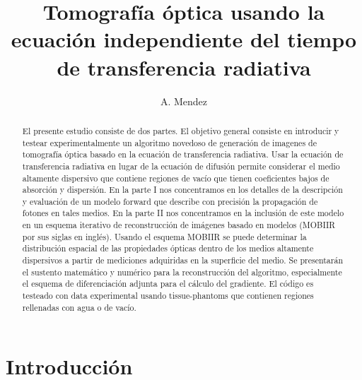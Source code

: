 \documentclass[a4paper,10pt]{article}
\title{Tomografía óptica usando la ecuación independiente del tiempo de transferencia radiativa}
\author{A. Mendez}
\begin{document}
\maketitle

\begin{abstract}
El presente estudio consiste de dos partes. El objetivo general consiste
en introducir y testear experimentalmente un algoritmo novedoso de 
generación de imagenes de tomografía óptica basado en la ecuación de 
transferencia radiativa. Usar la ecuación de transferencia radiativa
en lugar de la ecuación de difusión permite considerar el medio 
altamente dispersivo que contiene regiones de vacío que tienen 
coeficientes bajos de absorción y dispersión.
En la parte I nos concentramos en los detalles de la descripción y 
evaluación de un modelo forward que describe con precisión la propagación 
de fotones en tales medios. En la parte II nos concentramos en la 
inclusión de este modelo en un esquema iterativo de reconstrucción de 
imágenes basado en modelos (MOBIIR por sus siglas en inglés). Usando el 
esquema MOBIIR se puede determinar la distribución espacial de las 
propiedades ópticas dentro de los medios altamente dispersivos a partir 
de mediciones adquiridas en la superficie del medio. Se presentarán el 
sustento matemático y numérico para la reconstrucción del algoritmo,
especialmente el esquema de diferenciación adjunta para el cálculo del
gradiente. El código es testeado con data experimental usando 
tissue-phantoms que contienen regiones rellenadas con agua o de vacío.

\end{abstract}

\section{Introducción}
\end{document}
